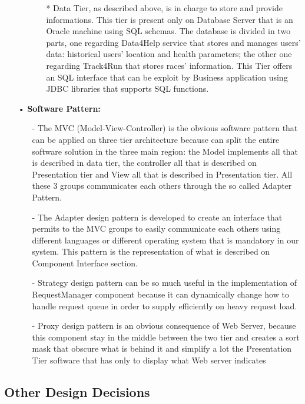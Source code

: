 \begin{enumerate}
\begin{enumerate}
\begin{enumerate}
	\item[*] Data Tier, as described above, is in charge to store and provide informations. This tier is present only on Database Server that is an Oracle machine using SQL schemas. The database is divided in two parts, one regarding Data4Help service that stores and manages users' data: historical users' location and health parameters; the other one regarding Track4Run that stores races' information. This Tier offers an SQL interface that can be exploit by Business application using JDBC libraries that supports SQL functions. 
		\end{enumerate}
	
	\end{enumerate}

\item[•] \textbf{Software Pattern: }

	\begin{enumerate}
	\item[-] The MVC (Model-View-Controller) is the obvious software pattern that can be applied on three tier architecture because can split the entire software solution in the three main region: the Model implements all that is described in data tier, the controller all that is described on Presentation tier and View all that is described in Presentation tier. All these 3 groups communicates each others through the so called Adapter Pattern.
	\item[-] The Adapter design pattern is developed to create an interface that permits to the MVC groups to easily communicate each others using different languages or different operating system that is mandatory in our system. This pattern is the representation of what is described on Component Interface section.
	\item[-] Strategy design pattern can be so much useful in the implementation of RequestManager component because it can dynamically change how to handle request queue in order to supply efficiently on heavy request load.
	\item[-] Proxy design pattern is an obvious consequence of Web Server, because this component stay in the middle between the two tier and creates a sort mask  that obscure what is behind it and simplify a lot the Presentation Tier software that has only to display what Web server indicates	
	\end{enumerate}

\end{enumerate}




\subsection{Other Design Decisions}